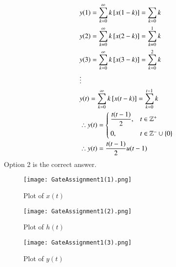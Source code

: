 \documentclass[journal,12pt,twocolumn]{IEEEtran}
\begin{document}
\begin{align}
&y(1)=\displaystyle\sum_{k=0}^{\infty}k{}\left[x(1-k)\right]=\displaystyle\sum_{k=0}k\\
&y(2)=\displaystyle\sum_{k=0}^{\infty}k{}\left[x(2-k)\right]=\displaystyle\sum_{k=0}^{1}k\\
&y(3)=\displaystyle\sum_{k=0}^{\infty}k{}\left[x(3-k)\right]=\displaystyle\sum_{k=0}^{2}k\\
&\vdots\\
&y(t)=\displaystyle\sum_{k=0}^{\infty}k{}\left[x(t-k)\right]=\displaystyle\sum_{k=0}^{t-1}k\\
&\therefore y(t)=\begin{cases}
	\dfrac{t(t-1)}{2}, & t \in \mathbb{Z}^{+} \\~\\[-1em]
	0, & t \in \mathbb{Z}^{-} \cup \left\{0\right\}
	\end{cases}\\ 
&\therefore y(t)=\dfrac{t(t-1)}{2}u(t-1)
\end{align}
Option 2 is the correct answer.

\begin{figure}[!h]
 \centering
 \texttt{[image: GateAssignment1(1).png]}
 \caption{Plot of $x(t)$}
 \label{plot}
\end{figure}

\begin{figure}[!h]
 \centering
 \texttt{[image: GateAssignment1(2).png]}
 \caption{Plot of $h(t)$}
 \label{plot}
\end{figure}

\begin{figure}[!h]
 \centering
 \texttt{[image: GateAssignment1(3).png]}
 \caption{Plot of $y(t)$}
 \label{plot}
\end{figure}
\end{document}
